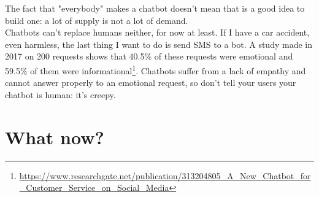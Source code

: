 \documentclass{article}
\begin{document}
The fact that "everybody" makes a chatbot doesn't mean that is a good idea to build one: a lot of supply is not a lot of demand.\\
\break
Chatbots can’t replace humans neither, for now at least. If I have a car accident, even harmless, the last thing I want to do is send SMS to a bot. A study made in 2017 on 200 requests shows that 40.5\% of these requests were emotional and 59.5\% of them were informational\footnote{\url{https://www.researchgate.net/publication/313204805_A_New_Chatbot_for_Customer_Service_on_Social_Media}}. Chatbots suffer from a lack of empathy and cannot answer properly to an emotional request, so don’t tell your users your chatbot is human: it’s creepy.

\section{What now?}
\end{document}
